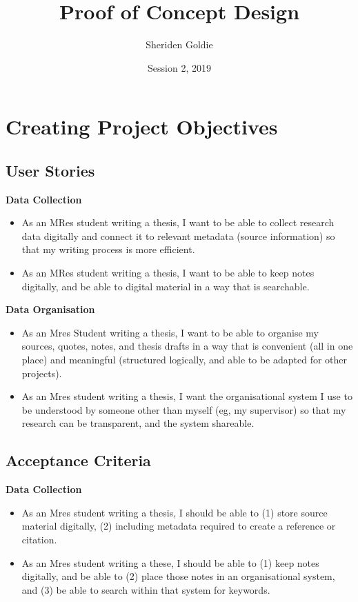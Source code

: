\documentclass{article}
\title{Proof of Concept Design}
\author{Sheriden Goldie}
\date{Session 2, 2019}
\begin{document}
\maketitle

\tableofcontents

\pagebreak

\section{Creating Project Objectives}
\subsection{User Stories}

\textbf{Data Collection}
\begin{itemize}
    \item As an MRes student writing a thesis, I want to be able to collect research data digitally and connect it to relevant metadata (source information) so that my writing process is more efficient.
    \item As an MRes student writing a thesis, I want to be able to keep notes digitally, and be able to digital material in a way that is searchable.
\end{itemize}

\noindent \textbf{Data Organisation}
\begin{itemize}
    \item As an Mres Student writing a thesis, I want to be able to organise my sources, quotes, notes, and thesis drafts in a way that is convenient (all in one place) and meaningful (structured logically, and able to be adapted for other projects).
    \item As an Mres student writing a thesis, I want the organisational system I use to be understood by someone other than myself (eg, my supervisor) so that my research can be transparent, and the system shareable.
\end{itemize}

\subsection{Acceptance Criteria}
\textbf{Data Collection}
\begin{itemize}
    \item As an Mres student writing a thesis, I should be able to (1) store source material digitally, (2) including metadata required to create a reference or citation.
    \item As an  Mres student writing a these, I should be able to (1) keep notes digitally, and be able to (2) place those notes in an organisational system, and (3) be able to search within that system for keywords. 
\end{itemize}
\end{document}
